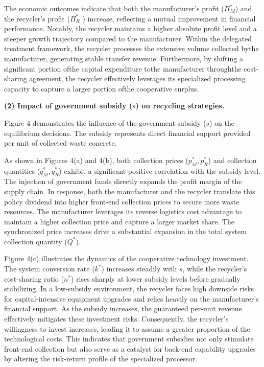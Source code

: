 \documentclass[authoryear,preprint,review,times,10pt]{elsarticle}
\begin{document}
The economic outcomes indicate that both the manufacturer's profit ($\Pi_M^*$) and the recycler's profit ($\Pi_R^*$ ) increase, reflecting a mutual improvement in financial performance. Notably, the recycler maintains a higher absolute profit level and a steeper growth trajectory compared to the manufacturer. Within the delegated treatment framework, the recycler processes the extensive volume collected bythe manufacturer, generating stable transfer revenue. Furthermore, by shifting a significant portion ofthe capital expenditure tothe manufacturer throughthe cost-sharing agreement, the recycler effectively leverages its specialized processing capacity to capture a larger portion ofthe cooperative surplus.

\noindent\textbf{(2) Impact of government subsidy ($s$) on recycling strategies.}
\label{sec:s_subsidy_impact}

Figure 4 demonstrates the influence of the government subsidy ($s$) on the equilibrium decisions. The subsidy represents direct financial support provided per unit of collected waste concrete.

As shown in Figures 4(a) and 4(b), both collection prices ($p_M^*, p_R^*$) and collection quantities ($q_M^*, q_R^*$) exhibit a significant positive correlation with the subsidy level. The injection of government funds directly expands the profit margin of the supply chain. In response, both the manufacturer and the recycler translate this policy dividend into higher front-end collection prices to secure more waste resources. The manufacturer leverages its reverse logistics cost advantage to maintain a higher collection price and capture a larger market share. The synchronized price increases drive a substantial expansion in the total system collection quantity ($Q^*$).

Figure 4(c) illustrates the dynamics of the cooperative technology investment. The system conversion rate ($k^*$) increases steadily with $s$, while the recycler's cost-sharing ratio ($n^*$) rises sharply at lower subsidy levels before gradually stabilizing. In a low-subsidy environment, the recycler faces high downside risks for capital-intensive equipment upgrades and relies heavily on the manufacturer's financial support. As the subsidy increases, the guaranteed per-unit revenue effectively mitigates these investment risks. Consequently, the recycler's willingness to invest increases, leading it to assume a greater proportion of the technological costs. This indicates that government subsidies not only stimulate front-end collection but also serve as a catalyst for back-end capability upgrades by altering the risk-return profile of the specialized processor.
\end{document}

